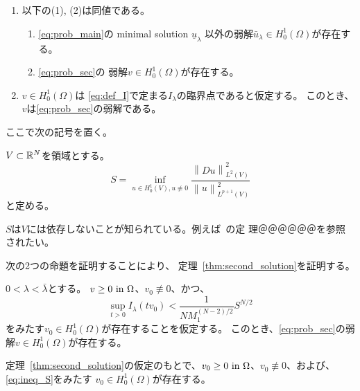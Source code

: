 \begin{lem}
 \begin{enumerate}[1.]
  \item 以下の(1), (2)は同値である。
        \begin{enumerate}[(1)]
         \item \ref{eq:prob_main}の minimal solution $\underline{u}_\lambda$
               以外の弱解$\bar{u}_\lambda \in H_0^1(\Omega)$が存在する。
         \item \ref{eq:prob_sec}の
               弱解$v \in H_0^1(\Omega)$が存在する。
        \end{enumerate}
  \item $v \in H_0^1(\Omega)$は
        \eqref{eq:def_I}で定まる$I_\lambda$の臨界点であると仮定する。
        このとき、$v$は\ref{eq:prob_sec}の弱解である。
 \end{enumerate}
\end{lem}

ここで次の記号を置く。

\begin{nota} \label{nota:S_def}
 $V \subset \mathbb{R}^N$を領域とする。
 \begin{equation}
  S = \inf_{u \in H^1_0(V), u \not \equiv 0}
 \frac{\left\| Du \right\|_{L^2(V)}^2}{\left\| u
                                       \right\|_{L^{p+1}(V)}^2}  
 \label{eq:S_def}
 \end{equation}
 と定める。
\end{nota}

$S$は$V$には依存しないことが知られている。例えば~\cite{田中200808}の定
理＠＠＠＠＠＠を参照されたい。

次の2つの命題を証明することにより、
定理~\ref{thm:second_solution}を証明する。

\begin{prop} \label{prop:second_1}
 $0 < \lambda < \bar{\lambda}$とする。
 $v \geq 0 ~\text{in}~ \Omega$、$v_0 \not \equiv 0$、かつ、
 \begin{equation}
  \sup_{t > 0} I_\lambda (tv_0) < \frac{1}{NM_1^{(N-2)/2}} S^{N/2} 
   \label{eq:ineq_S}
 \end{equation}
 をみたす$v_0 \in H_0^1(\Omega)$が存在することを仮定する。
 このとき、\ref{eq:prob_sec}の弱解$v \in H_0^1(\Omega)$が存在する。
\end{prop}

\begin{prop} \label{prop:second_2}
 定理~\ref{thm:second_solution}の仮定のもとで、$v_0 \geq 0 ~\text{in}~
 \Omega$、$v_0 \not \equiv 0$、および、\eqref{eq:ineq_S}をみたす
 $v_0 \in H_0^1(\Omega)$が存在する。
\end{prop}

